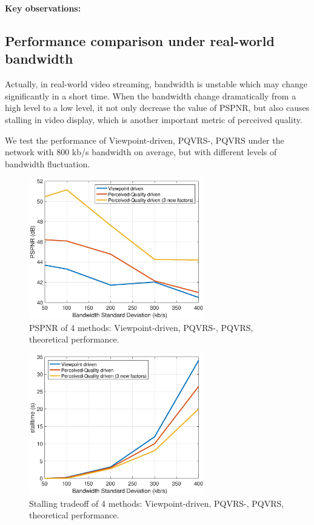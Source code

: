 \textbf{Key observations:}

\subsection{Performance comparison under real-world bandwidth}

Actually, in real-world video streaming, bandwidth is unstable which may change significantly in a short time. When the bandwidth change dramatically from a high level to a low level, it not only decrease the value of PSPNR, but also causes stalling in video display, which is another important metric of perceived quality.

We test the performance of Viewpoint-driven, PQVRS-, PQVRS under the network with 800 kb/s bandwidth on average, but with different levels of bandwidth fluctuation. 

   \begin{figure}
  \centering
  \includegraphics[width=3in]{images/throughput-PSPNR.eps}
  \caption{PSPNR of 4 methods: Viewpoint-driven, PQVRS-, PQVRS, theoretical performance.}
  \label{practical_imp}
  \end{figure}
  
    \begin{figure}
  \centering
  \includegraphics[width=3in]{images/throughput-stalltime.eps}
  \caption{Stalling tradeoff of 4 methods: Viewpoint-driven, PQVRS-, PQVRS, theoretical performance.}
  \label{practical_imp}
  \end{figure}

